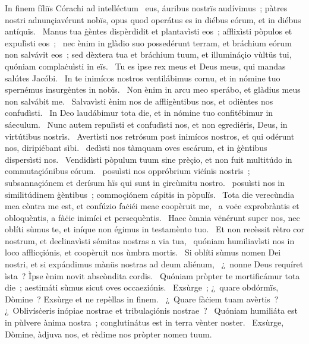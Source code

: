 { In finem fíliïs Córachi ad intelléctum}
{%
~eus, áuribus nostrïs audívimus~; pàtres nostri adnunçiavérunt nobïs, opus quod operátus es in diébus eórum, et in diébus antíquïs. 
~Manus tua ġèntes dispèrdidit et plantavìsti eos~; afflixìsti pòpulos et expulìsti eos~; 
~nec ènim in glàdio suo possedérunt terram, et bráchium eórum non salvávit eos~; sed dèxtera tua et bráchium tuum, et illumináçio vùltüs tui, quóniam complaċuìsti in eïs. 
~Tu es ìpse rex meus et Deus meus, qui mandas salútes Jacóbi. 
~In te inimícos nostros ventilábimus cornu, et in nómine tuo spernémus insurgèntes in nobïs. 
~Non ènim in arcu meo sperábo, et glàdius meus non salvábit me. 
~Salvavìsti ènim nos de affligèntibus nos, et odièntes nos confudìsti. 
~In Deo laudábimur tota die, et in nómine tuo confitébimur in sáeculum. 
~Nunc autem repulìsti et confudìsti nos, et non egrediéris, Deus, in virtútibus nostrïs. 
~Avertìsti nos retrósum post inimícos nostros, et qui odérunt nos, diripiébant sìbi. 
~dedìsti nos tàmquam oves escárum, et in ġèntibus dispersìsti nos. 
~Vendidìsti pòpulum tuum sine prèçio, et non fuit multitúdo in commutaçiónibus eórum. 
~posuìsti nos oppróbrium viċínïs nostrïs~; subsannaçiónem et derísum hïs qui sunt in çircùmitu nostro. 
~posuìsti nos in similitúdinem ġèntibus~; commoçiónem cápitis in pòpulïs. 
~Tota die verecùndia mea còntra me est, et confúzio faċiéi meae coopèruit me, 
~a voċe exprobràntis et obloquèntis, a fàċie inimíci et persequèntis. 
~Haec òmnia vënérunt super nos, nec oblíti sùmus te, et iníque non égimus in testamènto tuo. 
~Et non recèssit rètro cor nostrum, et declinavìsti sémitas nostras a via tua, 
~quóniam humiliavìsti nos in loco afflicçiónis, et coopèruit nos ùmbra mortis. 
~Si oblíti sùmus nomen Dei nostri, et si expándimus mànüs nostras ad deum aliénum, 
~¿~nonne Deus requíret ìsta~? Ìpse ènim novit abscòndita cordis. 
~Quóniam pròpter te mortificámur tota die~; aestimáti sùmus sicut oves occaeziónis. 
~Exsùrge~; ¿~quare obdórmïs, Dòmine~? Exsùrge et ne repèllas in finem. 
~¿~Quare fàċiem tuam avèrtis~? ¿~Oblivísċeris inópiae nostrae et tribulaçiónis nostrae~? 
~Quóniam humiliáta est in pùlvere ànima nostra~; conglutinátus est in terra vènter noster. 
~Exsùrge, Dòmine, àdjuva nos, et rèdime nos pròpter nomen tuum. 
}
